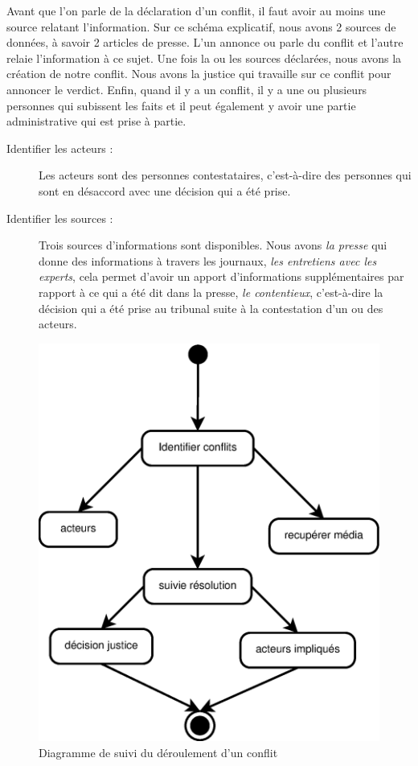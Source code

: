 \documentclass[12pt,a4paper]{article}
\begin{document}
Avant que l'on parle de la déclaration d'un conflit, il faut avoir au moins une source relatant l'information. Sur ce schéma explicatif, nous avons 2 sources de données, à savoir 2 articles de presse. L'un annonce ou parle du conflit et l'autre relaie l'information à ce sujet. Une fois la ou les sources déclarées, nous avons la création de notre conflit. Nous avons la justice qui travaille sur ce conflit pour annoncer le verdict. Enfin, quand il y a un conflit, il y a une ou plusieurs personnes qui subissent les faits et il peut également y avoir une partie administrative qui est prise à partie. \newline

\begin{description}
\item[Identifier les acteurs :] Les acteurs sont des personnes contestataires, c'est-à-dire des personnes qui sont en désaccord avec une décision qui a été prise. 
\item[Identifier les sources :] Trois sources d'informations sont disponibles. Nous avons \textit{la presse} qui donne des informations à travers les journaux, \textit{les entretiens avec les experts}, cela permet d'avoir un apport d'informations supplémentaires par rapport à ce qui a été dit dans la presse, \textit{le contentieux}, c'est-à-dire la décision qui a été prise au tribunal suite à la contestation d'un ou des acteurs. \newline
\end{description}

\clearpage
\begin{figure}[!h]
\centering
\includegraphics[width=\textwidth]{Image/diagrammeConflit.eps}
\caption{Diagramme de suivi du déroulement d'un conflit}
\end{figure}
\end{document}

